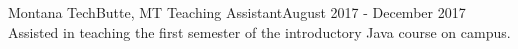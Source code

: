 

\experienceHeading
{Montana Tech}{Butte, MT}
{Teaching Assistant}{August 2017 - December 2017}
\experienceStart
        {Assisted in teaching the first semester of the introductory Java course on campus.}
\experienceEnd